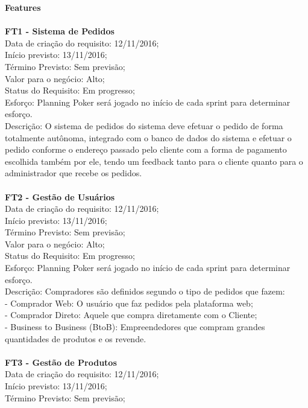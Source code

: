 \begin{apendicesenv}
\textbf{Features} \\
\\
\textbf{FT1 - Sistema de Pedidos}\\
\tab Data de criação do requisito: 12/11/2016;\\
\tab Início previsto: 13/11/2016;\\
\tab Término Previsto: Sem previsão;\\
\tab Valor para o negócio: Alto;\\
\tab Status do Requisito: Em progresso;\\
\tab Esforço: Planning Poker será jogado no início de cada sprint para determinar esforço.\\
\tab Descrição:  O sistema de pedidos do sistema deve efetuar o pedido de forma totalmente autônoma, integrado com o banco de dados do sistema e efetuar o pedido conforme o endereço passado pelo cliente com a forma de pagamento escolhida também por ele, tendo um feedback tanto para o cliente quanto para o administrador que recebe os pedidos.\\
\\
\textbf{FT2 - Gestão de Usuários}\\
\tab Data de criação do requisito: 12/11/2016;\\
\tab Início previsto: 13/11/2016;\\
\tab Término Previsto: Sem previsão;\\
\tab Valor para o negócio: Alto;\\
\tab Status do Requisito: Em progresso;\\
\tab Esforço: Planning Poker será jogado no início de cada sprint para determinar esforço.\\
\tab Descrição:  Compradores são definidos segundo o tipo de pedidos que fazem:\\
\tab - Comprador Web: O usuário que faz pedidos pela plataforma web;\\
\tab - Comprador Direto: Aquele que compra diretamente com o Cliente;\\
\tab - Business to Business (BtoB): Empreendedores que compram grandes quantidades de produtos e os revende.\\
\\
\textbf{FT3 - Gestão de Produtos }\\
\tab Data de criação do requisito: 12/11/2016;\\
\tab Início previsto: 13/11/2016;\\
\tab Término Previsto: Sem previsão;\\

\end{apendicesenv}
